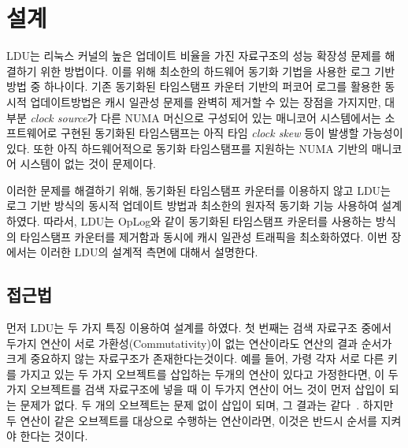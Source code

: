 \section{설계}
\label{sec:ldu}

LDU는 리눅스 커널의 높은 업데이트 비율을 가진 자료구조의 성능 확장성 문제를 
해결하기 위한 방법이다.
이를 위해 최소한의 하드웨어 동기화 기법을 사용한 로그 기반 방법 중 하나이다.
기존 동기화된 타임스탬프 카운터 기반의 퍼코어 로그를 활용한 동시적 업데이트방법은 
캐시 일관성 문제를 완벽히 제거할 수 있는 장점을 가지지만, 
대부분 \textit{clock source}가 다른 NUMA 머신으로 구성되어 있는 매니코어 시스템에서는 
소프트웨어로 구현된 동기화된 타임스탬프는 아직 타임 \textit{clock skew} 등이 발생할 가능성이 있다.
또한 아직 하드웨어적으로 동기화 타임스탬프를 지원하는 NUMA 기반의 매니코어 시스템이 없는 것이 문제이다.

이러한 문제를 해결하기 위해, 동기화된 타임스탬프 카운터를 이용하지 않고 
LDU는 로그 기반 방식의 동시적 업데이트 방법과 최소한의 원자적 동기화 기능 사용하여 설계하였다.
따라서, LDU는 OpLog와 같이 동기화된 타임스탬프 카운터를 사용하는 방식의 타임스탬프 카운터를 
제거함과 동시에 캐시 일관성 트래픽을 최소화하였다.
이번 장에서는 이러한 LDU의 설계적 측면에 대해서 설명한다. 

\subsection{접근법}
먼저 LDU는 두 가지 특징 이용하여 설계를 하였다. 
첫 번째는 검색 자료구조 중에서 두가지 연산이 서로 가환성(Commutativity)이 없는 연산이라도 
연산의 결과 순서가 크게 중요하지 않는 자료구조가 존재한다는것이다.
예를 들어, 가령 각자 서로 다른 키를 가지고 있는 두 가지 오브젝트를 삽입하는 두개의 
연산이 있다고 가정한다면, 이 두 가지 오브젝트를 검색 자료구조에 넣을 때 이 두가지 연산이 
어느 것이 먼저 삽입이 되는 문제가 없다. 
두 개의 오브젝트는 문제 없이 삽입이 되며, 그 결과는 같다~\cite{PaulCreatingAPILWN}. 
하지만 두 연산이 같은 오브젝트를 대상으로 수행하는 연산이라면, 이것은 반드시 
순서를 지켜야 한다는 것이다.  

